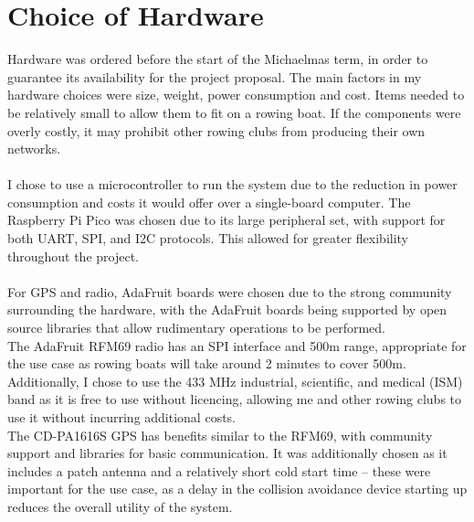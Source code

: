 \documentclass[12pt,a4paper]{report}
\begin{document}
\section{Choice of Hardware} 
Hardware was ordered before the start of the Michaelmas term, in order to guarantee its availability for the project proposal. The main factors in my hardware choices were size, weight, power consumption and cost. Items needed to be relatively small to allow them to fit on a rowing boat. If the components were overly costly, it may prohibit other rowing clubs from producing their own networks. \\ \\
I chose to use a microcontroller to run the system due to the reduction in power consumption and costs it would offer over a single-board computer. The Raspberry Pi Pico was chosen due to its large peripheral set, with support for both UART, SPI, and I2C protocols. This allowed for greater flexibility throughout the project. \\ \\ %
For GPS and radio, AdaFruit boards were chosen due to the strong community surrounding the hardware, with the AdaFruit boards being supported by open source libraries that allow rudimentary operations to be performed. \\
The AdaFruit RFM69 radio has an SPI interface and 500m range, appropriate for the use case as rowing boats will take around 2 minutes to cover 500m. Additionally, I chose to use the 433 MHz industrial, scientific, and medical (ISM) band as it is free to use without licencing, allowing me and other rowing clubs to use it without incurring additional costs. \\
The CD-PA1616S GPS has benefits similar to the RFM69, with community support and libraries for basic communication. It was additionally chosen as it includes a patch antenna and a relatively short cold start time -- these were important for the use case, as a delay in the collision avoidance device starting up reduces the overall utility of the system.
\end{document}
